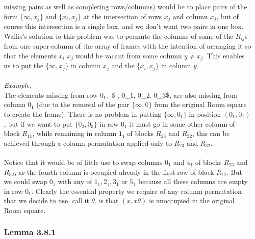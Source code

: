 \documentclass[
  12pt,
  a4paper]{book}
\begin{document}
missing pairs as well as completing rows/columns) would be to place
pairs of the form \(\{\infty, x_j\}\) and \(\{x_i, x_j\}\) at the
intersection of rows \(x_j\) and column \(x_j\), but of course this
intersection is a single box, and we don't want two pairs in one box.
Wallis's solution to this problem was to permute the columns of some of
the \(R_{ij}\)s from one super-column of the array of frames with the
intention of arranging it so that the elements \(x_i\) \(x_j\) would be
vacant from some column \(y \neq x_j\). This enables us to put the
\(\{\infty, x_j\}\) in column \(x_j\) and the \(\{x_i,x_j\}\) in column
\(y\).\\
~\\
\emph{Example,}\\
The elements missing from row \(0_1,\) \$ \infty, 0\_1, 0\_2, 0\_3\$,
are also missing from column \(0_1\) (due to the removal of the pair
\(\{\infty,0\}\) from the original Room square to create the frame).
There is no problem in putting \(\{\infty,0_1\}\) in position
\((0_1,0_1)\), but if we want to put \(\{0_2,0_3\}\) in row \(0_1\) it
must go in some other column of block \(R_{11}\), while remaining in
column \(1_1\) of blocks \(R_{23}\) and \(R_{32}\), this can be achieved
through a column permutation applied only to \(R_{23}\) and
\(R_{32}\).\\
~\\
Notice that it would be of little use to swap columns \(0_1\) and
\(4_1\) of blocks \(R_{23}\) and \(R_{32}\), as the fourth column is
occupied already in the first row of block \(R_{11}\). But we could swap
\(0_1\) with any of \(1_1,2_1,3_1\) or \(5_1\) because all these columns
are empty in row \(0_1\). Clearly the essential property we require of
any column permutation that we decide to use, call it \(\theta\), is
that \((x,x\theta)\) is unoccupied in the original Room square.

\hypertarget{lemma-3.8.1}{%
\subsubsection{Lemma 3.8.1}\label{lemma-3.8.1}}
\end{document}
